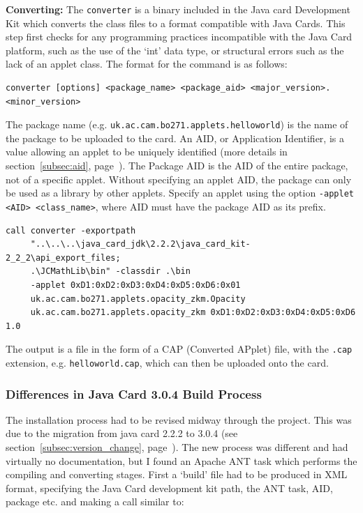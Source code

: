 \documentclass[12pt,a4paper]{article}
\begin{document}
\textbf{Converting:} The \verb|converter| is a binary included in the Java card Development Kit which converts the class files to a format compatible with Java Cards. This step first checks for any programming practices incompatible with the Java Card platform, such as the use of the `int' data type, or structural errors such as the lack of an applet class. The format for the command is as follows:
\begin{verbatim}
converter [options] <package_name> <package_aid> <major_version>.<minor_version>
\end{verbatim}

The package name (e.g. \verb|uk.ac.cam.bo271.applets.helloworld|) is the name of the package to be uploaded to the card. An AID, or Application Identifier, is a value allowing an applet to be uniquely identified (more details in section~\ref{subsec:aid}, page~\pageref{subsec:aid}). The Package AID is the AID of the entire package, not of a specific applet. Without specifying an applet AID, the package can only be used as a library by other applets. Specify an applet using the option 
\verb|-applet <AID> <class_name>|, where AID must have the package AID as its prefix.

\begin{verbatim}
call converter -exportpath 
     "..\..\..\java_card_jdk\2.2.2\java_card_kit-2_2_2\api_export_files;
     .\JCMathLib\bin" -classdir .\bin 
     -applet 0xD1:0xD2:0xD3:0xD4:0xD5:0xD6:0x01
     uk.ac.cam.bo271.applets.opacity_zkm.Opacity 
     uk.ac.cam.bo271.applets.opacity_zkm 0xD1:0xD2:0xD3:0xD4:0xD5:0xD6 1.0
\end{verbatim}

The output is a file in the form of a CAP (Converted APplet) file, with the \verb|.cap| extension, e.g. \verb|helloworld.cap|, which can then be uploaded onto the card. 

\subsubsection{Differences in Java Card 3.0.4 Build Process}
The installation process had to be revised midway through the project. This was due to the migration from java card 2.2.2 to 3.0.4 (see section~\ref{subsec:version_change}, page~\pageref{subsec:version_change}). The new process was different and had virtually no documentation, but I found an Apache ANT task which performs the compiling and converting stages. First a `build' file had to be produced in XML format, specifying the Java Card development kit path, the ANT task, AID, package etc. and making a call similar to:
\end{document}
